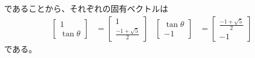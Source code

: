 であることから、それぞれの固有ベクトルは
\begin{align}
	\left[
	\begin{array}{c}
		1 \\ \tan\theta
	\end{array}
	\right]
&=
	\left[
	\begin{array}{c}
		1 \\ \frac{-1+\sqrt{5}}{2}
	\end{array}
	\right] &
%
%
	\left[
	\begin{array}{c}
		\tan\theta \\ -1
	\end{array}
	\right]
&=
	\left[
	\begin{array}{c}
		\frac{-1+\sqrt{5}}{2} \\ -1
	\end{array}
	\right]
\end{align}
である。
